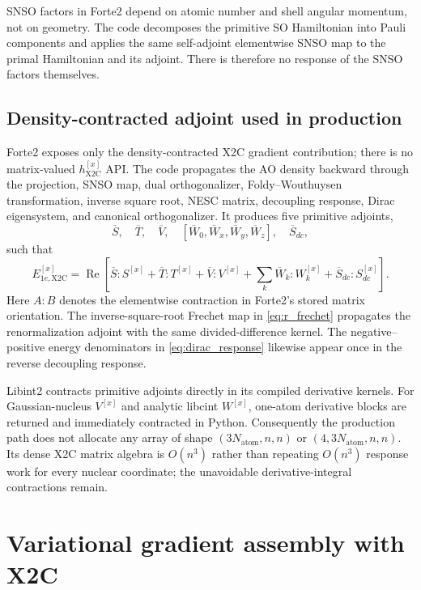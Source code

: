 \documentclass[aip,jcp,preprint]{revtex4-1}
\newcommand{\RePart}{\operatorname{Re}}
\newcommand{\xcoord}{{[x]}}
\begin{document}
SNSO factors in Forte2 depend on atomic number and shell angular momentum, not
on geometry.  The code decomposes the primitive SO Hamiltonian into Pauli
components and applies the same self-adjoint elementwise SNSO map to the primal
Hamiltonian and its adjoint.  There is therefore no response of the SNSO factors
themselves.

\subsection{Density-contracted adjoint used in production}

Forte2 exposes only the density-contracted X2C gradient contribution; there is
no matrix-valued $h_\mathrm{X2C}^\xcoord$ API.  The code propagates the AO
density backward through the projection, SNSO map, dual orthogonalizer,
Foldy--Wouthuysen transformation, inverse square root, NESC matrix, decoupling
response, Dirac eigensystem, and canonical orthogonalizer.
It produces five primitive adjoints,
\begin{equation}
 \overline S,\quad \overline T,\quad \overline V,\quad
 [\overline W_0,\overline W_x,\overline W_y,\overline W_z],\quad
 \overline S_{dc},
\end{equation}
such that
\begin{equation}
 E_{1e,\mathrm{X2C}}^\xcoord
 =\RePart\left[
 \overline S:S^\xcoord+\overline T:T^\xcoord
 +\overline V:V^\xcoord+\sum_k\overline W_k:W_k^\xcoord
 +\overline S_{dc}:S_{dc}^\xcoord\right].
 \label{eq:x2c_adjoint_contraction}
\end{equation}
Here $A:B$ denotes the elementwise contraction in Forte2's stored matrix
orientation.  The inverse-square-root Frechet map in
\cref{eq:r_frechet} propagates the renormalization adjoint with the same
divided-difference kernel.  The
negative--positive energy denominators in \cref{eq:dirac_response} likewise
appear once in the reverse decoupling response.

Libint2 contracts primitive adjoints directly in its compiled derivative
kernels.  For Gaussian-nucleus $V^\xcoord$ and analytic libcint
$W^\xcoord$, one-atom derivative blocks are returned and immediately contracted
in Python.  Consequently the production path does not allocate any array of
shape $(3N_\mathrm{atom},n,n)$ or
$(4,3N_\mathrm{atom},n,n)$.  Its dense X2C matrix algebra is
$O(n^3)$ rather than repeating $O(n^3)$ response work for every nuclear
coordinate; the unavoidable derivative-integral contractions remain.

\section{Variational gradient assembly with X2C}
\end{document}
